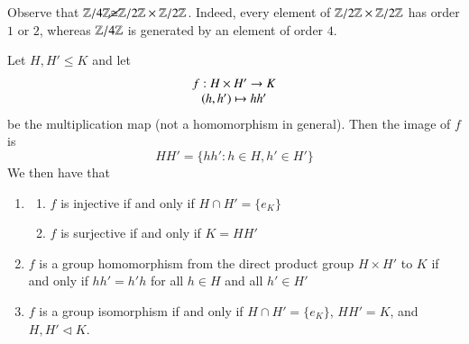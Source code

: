 \documentclass[12pt, a4paper, oneside, openright, titlepage]{book}
\begin{document}
\begin{eg}
        Observe that $\mathbb Z/4\mathbb Z \cancel{\cong} \mathbb Z/2\mathbb Z \times \mathbb Z/2\mathbb Z$. Indeed, every element of $\mathbb Z/2\mathbb Z \times \mathbb Z/2\mathbb Z$ has order $1$ or $2$, whereas $\mathbb Z/4\mathbb Z$ is generated by an element of order $4$.
\end{eg}


\begin{prop}
        Let $H,H' \leq K$ and let \begin{equation}
                \begin{array}{c} f:H\times H' \rightarrow K \\ (h,h') \mapsto hh' \end{array}
        \end{equation}
        be the multiplication map (not a homomorphism in general). Then the image of $f$ is \begin{equation}
                HH' = \{hh':h\in H, h' \in H'\}
        \end{equation}
        We then have that \begin{enumerate}
                \item \begin{enumerate}
                                \item $f$ is injective if and only if $H \cap H' = \{e_K\}$
                                \item $f$ is surjective if and only if $K = HH'$
                        \end{enumerate}
                \item $f$ is a group homomorphism from the direct product group $H \times H'$ to $K$ if and only if $hh' = h'h$ for all $h \in H$ and all $h' \in H'$
                \item $f$ is a group isomorphism if and only if $H \cap H' = \{e_K\}$, $HH' = K$, and $H,H' \vartriangleleft K$.
        \end{enumerate}
\end{prop}
\end{document}
